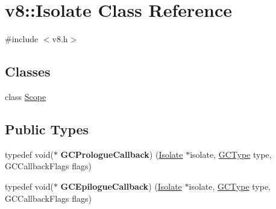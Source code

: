 \hypertarget{classv8_1_1_isolate}{}\section{v8\+:\+:Isolate Class Reference}
\label{classv8_1_1_isolate}


{\ttfamily \#include $<$v8.\+h$>$}

\subsection*{Classes}
\begin{DoxyCompactItemize}
\item 
class \hyperlink{classv8_1_1_isolate_1_1_scope}{Scope}
\end{DoxyCompactItemize}
\subsection*{Public Types}
\begin{DoxyCompactItemize}
\item 
\hypertarget{classv8_1_1_isolate_ab14f02c51e012f839e6cc184ede4814a}{}typedef void($\ast$ {\bfseries G\+C\+Prologue\+Callback}) (\hyperlink{classv8_1_1_isolate}{Isolate} $\ast$isolate, \hyperlink{namespacev8_ac109d6f27e0c0f9ef4e98bcf7a806cf2}{G\+C\+Type} type, G\+C\+Callback\+Flags flags)\label{classv8_1_1_isolate_ab14f02c51e012f839e6cc184ede4814a}

\item 
\hypertarget{classv8_1_1_isolate_a3e7351067af07d2a56c57d855fada4bb}{}typedef void($\ast$ {\bfseries G\+C\+Epilogue\+Callback}) (\hyperlink{classv8_1_1_isolate}{Isolate} $\ast$isolate, \hyperlink{namespacev8_ac109d6f27e0c0f9ef4e98bcf7a806cf2}{G\+C\+Type} type, G\+C\+Callback\+Flags flags)\label{classv8_1_1_isolate_a3e7351067af07d2a56c57d855fada4bb}

\end{DoxyCompactItemize}
